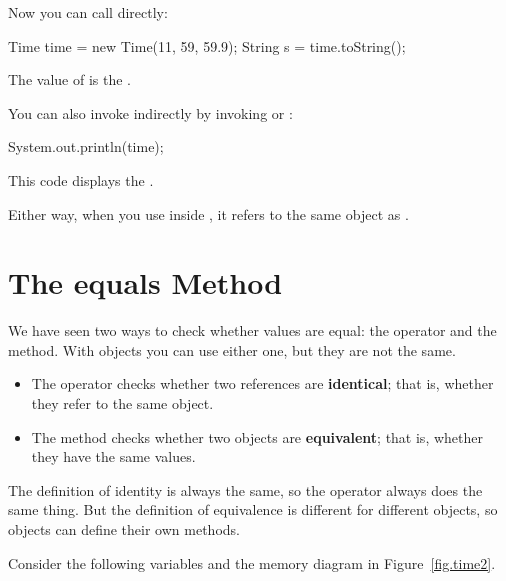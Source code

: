 
Now you can call  directly:

\begin{code}
Time time = new Time(11, 59, 59.9);
String s = time.toString();
\end{code}

The value of  is the  .

You can also invoke  indirectly by invoking  or :

\begin{code}
System.out.println(time);
\end{code}

This code displays the  . 

Either way, when you use  inside , it refers to the same object as .


\section{The equals Method}
\label{equals}


We have seen two ways to check whether values are equal: the \java{==} operator and the  method.
With objects you can use either one, but they are not the same.


\begin{itemize}

\item The \java{==} operator checks whether two references are {\bf identical}; that is, whether they refer to the same object.

\item The  method checks whether two objects are {\bf equivalent}; that is, whether they have the same values.

\end{itemize}

The definition of identity is always the same, so the \java{==} operator always does the same thing.
But the definition of equivalence is different for different objects, so objects can define their own  methods.

Consider the following variables and the memory diagram in Figure~\ref{fig.time2}.

